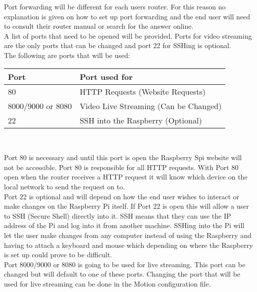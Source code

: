 \documentclass[12pt]{report}
\begin{document}
Port forwarding will be different for each users router. For this reason no explanation is given on how to set up port forwarding and the end user will need to consult their router manual or search for the answer online.\\

A list of ports that need to be opened will be provided. Ports for video streaming are the only ports that can be changed and port 22 for SSHing is optional. \\

The following are ports that will be used:

\begin{center}
    \begin{tabular}{ | l | p{7cm} |}
    \hline
    {\bf Port} & {\bf Port used for} \\ \hline
   80 & HTTP Requests (Website Requests) \\ \hline 
   8000/9000 or 8080 & Video Live Streaming (Can be Changed)\\ \hline
	22 & SSH into the Raspberry (Optional) \\ \hline
    \end{tabular}
    \\[0.5cm]
\end{center} 

Port 80 is necessary and until this port is open the Raspberry Spi website will not be accessible. Port 80 is responsible for all HTTP requests. With Port 80 open when the router receives a HTTP request it will know which device on the local network to send the request on to.\\

Port 22 is optional and will depend on how the end user wishes to interact or make changes on the Raspberry Pi itself. If Port 22 is open this will allow a user to SSH (Secure Shell) directly into it. SSH means that they can use the IP address of the Pi and log into it from another machine. SSHing into the Pi will let the user make changes from any computer instead of using the Raspberry and having to attach a keyboard and mouse which depending on where the Raspberry is set up could prove to be difficult.\\

Port 8000/9000 or 8080 is going to be used for live streaming. This port can be changed but will default to one of these ports. Changing the port that will be used for live streaming can be done in the Motion configuration file.\\
\end{document}

